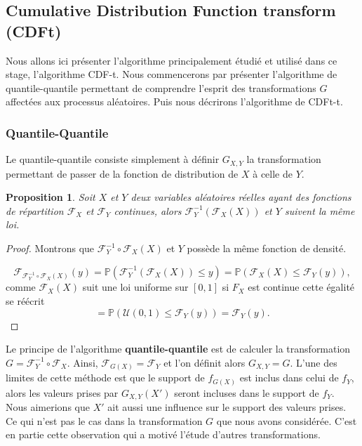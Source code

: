 \documentclass[a4paper,10pt]{article}
\newtheorem{proposition}{Proposition}
\begin{document}
\subsection{Cumulative Distribution Function transform (CDFt)}
Nous allons ici présenter l'algorithme principalement étudié et utilisé dans ce stage, l'algorithme CDF-t. Nous commencerons par présenter l'algorithme de quantile-quantile permettant de comprendre l'esprit des transformations $G$ affectées aux processus aléatoires. Puis nous décrirons l'algorithme de CDFt-t. 
 
\subsubsection{Quantile-Quantile}
\label{Q-Q}
Le quantile-quantile consiste simplement à définir $G_{X,Y}$ la transformation permettant de passer de la fonction de distribution de $X$ à celle de $Y$. 
\begin{proposition}
	Soit $X$ et $Y$ deux variables aléatoires réelles ayant des fonctions de répartition $\mathcal{F}_{X}$ et $\mathcal{F}_{Y}$ continues, alors 
	$\mathcal{F}^{-1}_Y (\mathcal{F}_X(X))$ et $Y$ suivent la même loi. 
\end{proposition}

\begin{proof}
	Montrons que $\mathcal{F}^{-1}_Y \circ \mathcal{F}_X(X)$ et $Y$ possède la même fonction de densité. 
	
	\[\mathcal{F}_{\mathcal{F}^{-1}_Y \circ \mathcal{F}_X(X)}(y)
		= \mathbb{P}(\mathcal{F}^{-1}_Y (\mathcal{F}_X(X))\leq y )
		= \mathbb{P}(\mathcal{F}_{X}(X) \leq \mathcal{F}_Y(y)),\]
	comme $\mathcal{F}_{X}(X)$ suit une loi uniforme sur $[0,1]$ si $F_X$ est continue cette égalité se réécrit
	\[= \mathbb{P}(\mathcal{U}(0,1) \leq \mathcal{F}_Y(y))=\mathcal{F}_Y(y).\]
	
	
\end{proof}
Le principe de l'algorithme \textbf{quantile-quantile} est de calculer la transformation $G=\mathcal{F}^{-1}_{Y} \circ \mathcal{F}_{X}$. Ainsi, $\mathcal{F}_{G(X)}=\mathcal{F}_{Y}$ et l'on définit alors $G_{X,Y}=G$. L'une des limites de cette méthode est que le support de $f_{G(X)}$ est inclus dans celui de $f_{Y}$, alors les valeurs prises par $G
_{X,Y}(X')$ seront incluses dans le support de $f_Y$. Nous aimerions que $X'$ ait aussi une influence sur le support des valeurs prises. Ce qui n'est pas le cas dans la transformation $G$ que nous avons considérée. C'est en partie cette observation qui a motivé l'étude d'autres transformations. 
\end{document}
